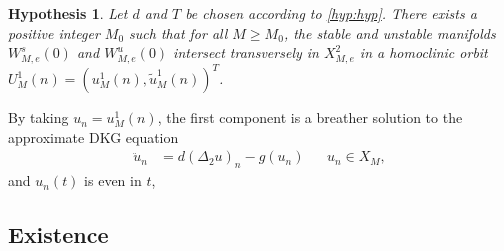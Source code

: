 \documentclass[12pt,reqno]{amsart}
\newtheorem{hypothesis}{Hypothesis}
\begin{document}
\begin{hypothesis}\label{hyp:breather}
Let $d$ and $T$ be chosen according to \cref{hyp:hyp}. There exists a positive integer $M_0$ such that for all $M \geq M_0$, the stable and unstable manifolds $W_{M,e}^s(0)$ and $W_{M,e}^u(0)$ intersect transversely in $X_{M,e}^2$ in a homoclinic orbit $U^1_M(n) = (u^1_M(n), \tilde{u}^1_M(n))^T$. 
\end{hypothesis}
By taking $u_n = u^1_M(n)$, the first component is a breather solution to the approximate DKG equation
\begin{equation}\label{eq:DKGapprox}
\begin{aligned}
\ddot{u}_n &= d (\Delta_2 u)_n - g(u_n) && u_n \in X_M,
\end{aligned}
\end{equation}
and $u_n(t)$ is even in $t$,

\subsection{Existence}
\end{document}
